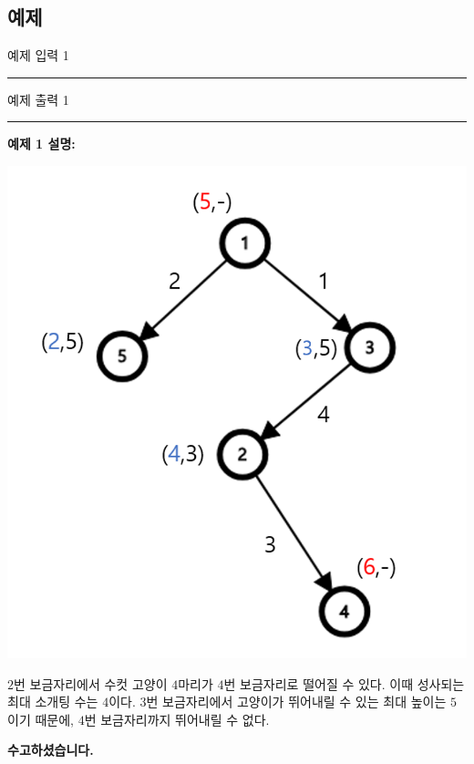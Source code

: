 \documentclass{article}
\def\inputdataname{예제 입력 } %
\def\outputdataname{예제 출력 } %
\newcommand{\iodataNo}[2]{%
	\begin{minipage}{\textwidth}
		\begin{multicols}{2}
			{\inputdataname#2} \\
			\rule{\columnwidth}{1pt}
			
			\columnbreak
			{\outputdataname#2} \\
			\rule{\columnwidth}{1pt}
			
		\end{multicols}
		\vspace{\baselineskip}
	\end{minipage}

}
\begin{document}
\subsection{예제}

\iodataNo{c1}{1}

\textbf{예제 1 설명:}\newline
\begin{center}
	\includegraphics[scale=0.27]{images/06.png}
\end{center}
$2$번 보금자리에서 수컷 고양이 $4$마리가 $4$번 보금자리로 떨어질 수 있다. 이때 성사되는 최대 소개팅 수는 $4$이다. $3$번 보금자리에서 고양이가 뛰어내릴 수 있는 최대 높이는 $5$이기 때문에, $4$번 보금자리까지 뛰어내릴 수 없다.\newline

\vspace{2.5cm}
\begin{center}
	\Large \bf \color{blue}수고하셨습니다.
\end{center}
\end{document}
